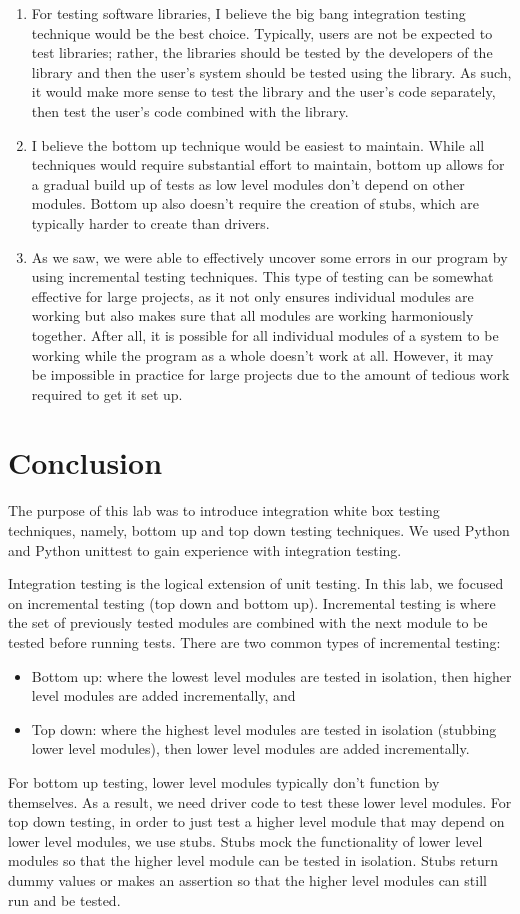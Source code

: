 \documentclass[12pt, letterpaper, titlepage]{article}
\begin{document}
\begin{enumerate}
    \item For testing software libraries, I believe the big bang integration testing technique would be the best choice. Typically, users are not be expected to test libraries; rather, the libraries should be tested by the developers of the library and then the user's system should be tested using the library. As such, it would make more sense to test the library and the user's code separately, then test the user's code combined with the library.
    \item I believe the bottom up technique would be easiest to maintain. While all techniques would require substantial effort to maintain, bottom up allows for a gradual build up of tests as low level modules don't depend on other modules. Bottom up also doesn't require the creation of stubs, which are typically harder to create than drivers.
    \item As we saw, we were able to effectively uncover some errors in our program by using incremental testing techniques. This type of testing can be somewhat effective for large projects, as it not only ensures individual modules are working but also makes sure that all modules are working harmoniously together. After all, it is possible for all individual modules of a system to be working while the program as a whole doesn't work at all. However, it may be impossible in practice for large projects due to the amount of tedious work required to get it set up. 
\end{enumerate}

\section*{Conclusion}
The purpose of this lab was to introduce integration white box testing techniques, namely, bottom up and top down testing techniques. We used Python and Python unittest to gain experience with integration testing.

Integration testing is the logical extension of unit testing. In this lab, we focused on incremental testing (top down and bottom up). Incremental testing is where the set of previously tested modules are combined with the next module to be tested before running tests. There are two common types of incremental testing:
\begin{itemize}
    \item Bottom up: where the lowest level modules are tested in isolation, then higher level modules are added incrementally, and
    \item Top down: where the highest level modules are tested in isolation (stubbing lower level modules), then lower level modules are added incrementally.
\end{itemize}
For bottom up testing, lower level modules typically don't function by themselves. As a result, we need driver code to test these lower level modules. For top down testing, in order to just test a higher level module that may depend on lower level modules, we use stubs. Stubs mock the functionality of lower level modules so that the higher level module can be tested in isolation. Stubs return dummy values or makes an assertion so that the higher level modules can still run and be tested. 
\end{document}
